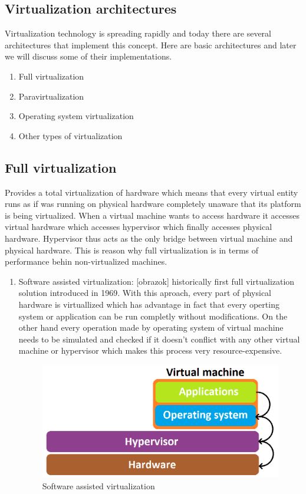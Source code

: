 \begin{enumerate}
\section{Virtualization architectures}
Virtualization technology is spreading rapidly and today there are several architectures that implement this concept. Here are basic architectures and later we will discuss some of their implementations.
\begin{enumerate}
\item Full virtualization
\item Paravirtualization
\item Operating system virtualization
\item Other types of virtualization
\end{enumerate}

\subsection{Full virtualization}
Provides a total virtualization of hardware which means that every virtual entity runs as if was running on physical hardware completely unaware that its platform is being virtualized. When a virtual machine wants to access hardware it accesses virtual hardware which accesses hypervisor which finally accesses physical hardware. Hypervisor thus acts as the only bridge between virtual machine and physical hardware. This is reason why full virtualization is in terms of performance behin non-virtualized machines.
\begin{enumerate}
\item Software assisted virtualization: [obrazok] historically first full virtualization solution introduced in 1969. With this aproach, every part of physical hardware is virtuallized which has advantage in fact that every operting system or application can be run completly without modifications. On the other hand every operation made by operating system of virtual machine needs to be simulated and checked if it doesn't conflict with any other virtual machine or hypervisor which makes this process very resource-expensive.

\begin{figure}[H]
\centering
\includegraphics[scale=0.45]{sw-assist.png}
\caption{Software assisted virtualization}
\end{figure}


\end{enumerate}
\end{enumerate}
